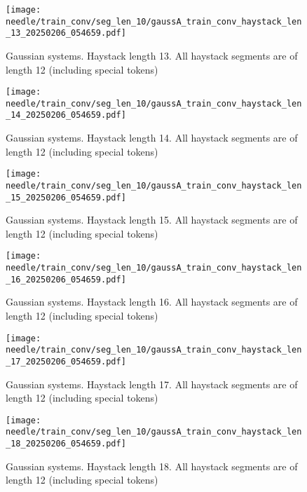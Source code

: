 \begin{figure}
    \centering
    \texttt{[image: needle/train\_conv/seg\_len\_10/gaussA\_train\_conv\_haystack\_len\_13\_20250206\_054659.pdf]}
    \caption{Gaussian systems. Haystack length 13. All haystack segments are of length 12 (including special tokens)}
    \label{fig:gauss_needle_train_conv_haystack_len_13_all_haystack_len_12}
    
\end{figure}

\begin{figure}
    \centering
    \texttt{[image: needle/train\_conv/seg\_len\_10/gaussA\_train\_conv\_haystack\_len\_14\_20250206\_054659.pdf]}
    \caption{Gaussian systems. Haystack length 14. All haystack segments are of length 12 (including special tokens)}
    \label{fig:gauss_needle_train_conv_haystack_len_14_all_haystack_len_12}
\end{figure}

\begin{figure}
    \centering
    \texttt{[image: needle/train\_conv/seg\_len\_10/gaussA\_train\_conv\_haystack\_len\_15\_20250206\_054659.pdf]}
    \caption{Gaussian systems. Haystack length 15. All haystack segments are of length 12 (including special tokens)}
    \label{fig:gauss_needle_train_conv_haystack_len_15_all_haystack_len_12}
\end{figure}

\begin{figure}
    \centering
    \texttt{[image: needle/train\_conv/seg\_len\_10/gaussA\_train\_conv\_haystack\_len\_16\_20250206\_054659.pdf]}
    \caption{Gaussian systems. Haystack length 16. All haystack segments are of length 12 (including special tokens)}
    \label{fig:gauss_needle_train_conv_haystack_len_16_all_haystack_len_12}
\end{figure}

\begin{figure}
    \centering
    \texttt{[image: needle/train\_conv/seg\_len\_10/gaussA\_train\_conv\_haystack\_len\_17\_20250206\_054659.pdf]}
    \caption{Gaussian systems. Haystack length 17. All haystack segments are of length 12 (including special tokens)}
    \label{fig:gauss_needle_train_conv_haystack_len_17_all_haystack_len_12}
\end{figure}

\begin{figure}
    \centering
    \texttt{[image: needle/train\_conv/seg\_len\_10/gaussA\_train\_conv\_haystack\_len\_18\_20250206\_054659.pdf]}
    \caption{Gaussian systems. Haystack length 18. All haystack segments are of length 12 (including special tokens)}
    \label{fig:gauss_needle_train_conv_haystack_len_18_all_haystack_len_12}
\end{figure}

